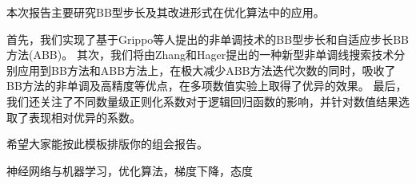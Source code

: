 
\clearpage

\setcounter{page}{1}


本次报告主要研究BB型步长及其改进形式在优化算法中的应用。

首先，我们实现了基于Grippo等人提出的非单调技术\cite{grippo1991class}的BB型步长\cite{barzilai1988two}和自适应步长BB方法(ABB)\cite{zhou2006gradient}。
其次，我们将由Zhang和Hager提出的一种新型非单调线搜索技术\cite{zhang2004nonmonotone}分别应用到BB方法和ABB方法上，在极大减少ABB方法迭代次数的同时，吸收了BB方法的非单调及高精度等优点，在多项数值实验上取得了优异的效果。
最后，我们还关注了不同数量级正则化系数对于逻辑回归函数的影响，并针对数值结果选取了表现相对优异的系数。

希望大家能按此模板排版你的组会报告。

\vspace{\baselineskip}
 神经网络与机器学习，优化算法，梯度下降，态度



\titlespacing{\chapter}{0pt}{-6mm}{5mm}
